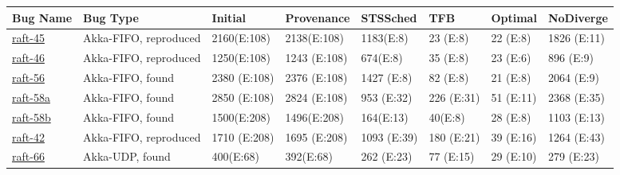 

\begin{table*}
{
\centering
\footnotesize
\begin{tabular}{|l|l|l|l|l|l||l||l|}
  \cline{1-8}
  \textbf{Bug Name} & \textbf{Bug Type} &
  \textbf{Initial} & \textbf{Provenance} &
  \textbf{STSSched} & \textbf{TFB} & \textbf{Optimal} & \textbf{NoDiverge} \\\cline{1-7} \hline
\href{https://docs.google.com/document/d/1alldH4lRSpFQ55-YCNFaIcMpjxrBOMNaB7R_9eEVwfs}{raft-45}
& Akka-FIFO, reproduced
& 2160\hfill (E:108) & 2138\hfill (E:108) & 1183\hfill (E:8) & 23 \hfill (E:8)
& 22 \hfill (E:8) & 1826 \hfill (E:11) \\

\href{https://docs.google.com/document/d/1vhGftMIlmm_uFLmCz2GI0CCPmttDUR617hJ72k2BTbY}{raft-46}
& Akka-FIFO, reproduced
& 1250\hfill (E:108) & 1243 \hfill (E:108) & 674\hfill (E:8) & 35 \hfill (E:8)
& 23 \hfill (E:6) & 896 \hfill (E:9) \\

\href{https://docs.google.com/document/d/1_UPKhjYoSrG9p4FQXqML_WQKa3WNbM2fch2aa0V-9Go}{raft-56}
& Akka-FIFO, found
& 2380 \hfill (E:108) & 2376 \hfill (E:108) & 1427 \hfill (E:8) & 82 \hfill
(E:8) & 21 \hfill (E:8) & 2064 \hfill (E:9) \\

\href{https://docs.google.com/document/d/1_efq5rbOGCG3sG-2qxbbOeIRztW9XYP6xgyh0QFmWXg}{raft-58a}
& Akka-FIFO, found
& 2850 \hfill (E:108) & 2824 \hfill (E:108) & 953 \hfill (E:32) & 226 \hfill
(E:31) & 51 \hfill (E:11) & 2368 \hfill (E:35) \\

\href{https://docs.google.com/document/d/1eERBdohTC3UidHJ6cZq12ixpp_eiVqzT7LvzuTeEtR4}{raft-58b}
& Akka-FIFO, found
& 1500\hfill (E:208) & 1496\hfill (E:208) & 164\hfill (E:13) & 40\hfill (E:8)
& 28 \hfill (E:8) & 1103 \hfill (E:13) \\

\href{https://docs.google.com/document/d/1BN4hpTKtN_-inqyT5XTGogI8QSlohnP2Y7A01nuW7TI}{raft-42}
& Akka-FIFO, reproduced
& 1710 \hfill (E:208) & 1695 \hfill (E:208) & 1093 \hfill (E:39) & 180 \hfill
(E:21) & 39 \hfill (E:16) & 1264 \hfill (E:43) \\

\href{https://docs.google.com/document/d/1lCAR_IE_U27CA-VTlPCi4Kyxf4h6Ykx-0zbkHe0Gfbg}{raft-66}
& Akka-UDP, found
& 400\hfill (E:68) & 392\hfill (E:68) & 262 \hfill (E:23) & 77 \hfill (E:15) &
29 \hfill (E:10) & 279 \hfill (E:23) \\


\end{tabular}}
\end{table*}
